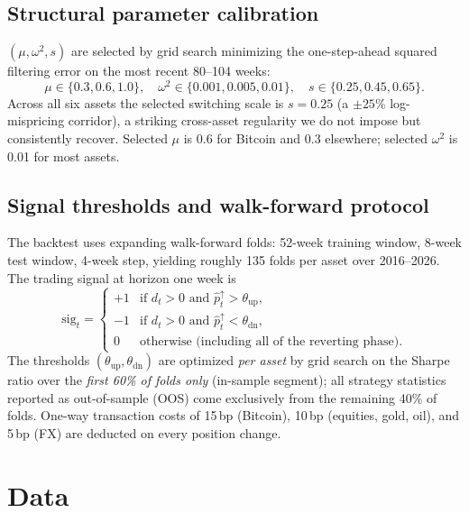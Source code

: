 \documentclass[11pt,a4paper]{article}
\begin{document}
\subsection{Structural parameter calibration}

$(\mu, \omega^2, s)$ are selected by grid search minimizing the one-step-ahead squared filtering error on the most recent 80--104 weeks:
\[
\mu \in \{0.3, 0.6, 1.0\}, \quad \omega^2 \in \{0.001, 0.005, 0.01\}, \quad s \in \{0.25, 0.45, 0.65\}.
\]
Across all six assets the selected switching scale is $s = 0.25$ (a $\pm 25\%$ log-mispricing corridor), a striking cross-asset regularity we do not impose but consistently recover. Selected $\mu$ is 0.6 for Bitcoin and 0.3 elsewhere; selected $\omega^2$ is 0.01 for most assets.

\subsection{Signal thresholds and walk-forward protocol}

The backtest uses expanding walk-forward folds: 52-week training window, 8-week test window, 4-week step, yielding roughly 135 folds per asset over 2016--2026. The trading signal at horizon one week is
\begin{equation}
\text{sig}_t =
\begin{cases}
+1 & \text{if } d_t > 0 \text{ and } \hat{p}^{\uparrow}_t > \theta_{\mathrm{up}},\\
-1 & \text{if } d_t > 0 \text{ and } \hat{p}^{\uparrow}_t < \theta_{\mathrm{dn}},\\
0 & \text{otherwise (including all of the reverting phase)}.
\end{cases}
\label{eq:signal}
\end{equation}
The thresholds $(\theta_{\mathrm{up}}, \theta_{\mathrm{dn}})$ are optimized \emph{per asset} by grid search on the Sharpe ratio over the \emph{first 60\% of folds only} (in-sample segment); all strategy statistics reported as out-of-sample (OOS) come exclusively from the remaining 40\% of folds. One-way transaction costs of 15\,bp (Bitcoin), 10\,bp (equities, gold, oil), and 5\,bp (FX) are deducted on every position change.

\section{Data}\label{sec:data}
\end{document}

